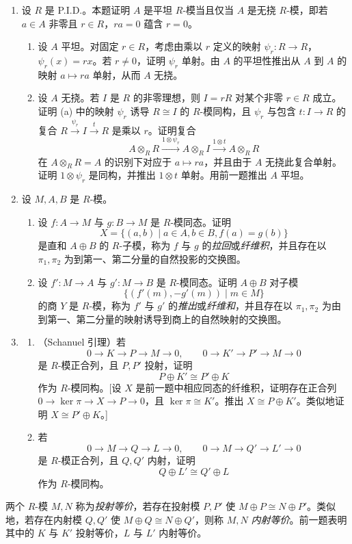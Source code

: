 \begin{enumerate}[label=\arabic*.]
	\item 设 $R$ 是 P.I.D.。本题证明 $A$ 是平坦 $R$-模当且仅当 $A$ 是无挠 $R$-模，即若 $a\in A$ 非零且 $r\in R$，$ra=0$ 蕴含 $r=0$。
	\begin{enumerate}[label=(\alph*)]
		\item 设 $A$ 平坦。对固定 $r\in R$，考虑由乘以 $r$ 定义的映射 $\psi_r:R\to R$，$\psi_r(x)=rx$。若 $r\neq0$，证明 $\psi_r$ 单射。由 $A$ 的平坦性推出从 $A$ 到 $A$ 的映射 $a\mapsto ra$ 单射，从而 $A$ 无挠。
		\item 设 $A$ 无挠。若 $I$ 是 $R$ 的非零理想，则 $I=rR$ 对某个非零 $r\in R$ 成立。证明 (a) 中的映射 $\psi_r$ 诱导 $R\cong I$ 的 $R$-模同构，且 $\psi_r$ 与包含 $t:I\to R$ 的复合 $R\xrightarrow{\psi_r}I\xrightarrow{t}R$ 是乘以 $r$。证明复合
		\[
		A\otimes_RR\xrightarrow{1\otimes\psi_r}A\otimes_RI
		\xrightarrow{1\otimes t}A\otimes_RR
		\]
		在 $A\otimes_RR=A$ 的识别下对应于 $a\mapsto ra$，并且由于 $A$ 无挠此复合单射。证明 $1\otimes\psi_r$ 是同构，并推出 $1\otimes t$ 单射。用前一题推出 $A$ 平坦。
	\end{enumerate}
	\item 设 $M,A,B$ 是 $R$-模。
	\begin{enumerate}[label=(\alph*)]
		\item 设 $f:A\to M$ 与 $g:B\to M$ 是 $R$-模同态。证明
		\[
		X=\{(a,b)\mid a\in A,
		b\in B,
		f(a)=g(b)\}
		\]
		是直和 $A\oplus B$ 的 $R$-子模，称为 $f$ 与 $g$ 的\emph{拉回}或\emph{纤维积}，并且存在以 $\pi_1,
		\pi_2$ 为到第一、第二分量的自然投影的交换图。
		\item 设 $f':M\to A$ 与 $g':M\to B$ 是 $R$-模同态。证明 $A\oplus B$ 对子模
		\[
		\{(f'(m),-g'(m))\mid m\in M\}
		\]
		的商 $Y$ 是 $R$-模，称为 $f'$ 与 $g'$ 的\emph{推出}或\emph{纤维和}，并且存在以 $\pi_1,
		\pi_2$ 为由到第一、第二分量的映射诱导到商上的自然映射的交换图。
	\end{enumerate}
	\item
	\begin{enumerate}[label=(\alph*)]
		\item （Schanuel 引理）若
		\[
		0\to K\to P\to M\to0,
		\qquad
		0\to K'\to P'\to M\to0
		\]
		是 $R$-模正合列，且 $P,P'$ 投射，证明
		\[
		P\oplus K'\cong P'\oplus K
		\]
		作为 $R$-模同构。[设 $X$ 是前一题中相应同态的纤维积，证明存在正合列 $0\to\ker\pi\to X\to P\to0$，且 $\ker\pi\cong K'$。推出 $X\cong P\oplus K'$。类似地证明 $X\cong P'\oplus K$。]
		\item 若
		\[
		0\to M\to Q\to L\to0,
		\qquad
		0\to M\to Q'\to L'\to0
		\]
		是 $R$-模正合列，且 $Q,Q'$ 内射，证明
		\[
		Q\oplus L'\cong Q'\oplus L
		\]
		作为 $R$-模同构。
	\end{enumerate}
\end{enumerate}
\noindent 两个 $R$-模 $M,N$ 称为\emph{投射等价}，若存在投射模 $P,P'$ 使 $M\oplus P\cong N\oplus P'$。类似地，若存在内射模 $Q,Q'$ 使 $M\oplus Q\cong N\oplus Q'$，则称 $M,N$ \emph{内射等价}。前一题表明其中的 $K$ 与 $K'$ 投射等价，$L$ 与 $L'$ 内射等价。

